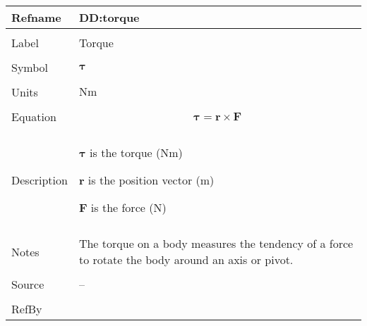 \documentclass[12pt]{article}
\begin{document}
\vspace{\baselineskip}
\noindent
\begin{minipage}{\textwidth}
\begin{tabular}{>{\raggedright}p{}>{\raggedright\arraybackslash}p{}}
\toprule \textbf{Refname} & \textbf{DD:torque}
\label{DD:torque}
\\ \midrule \\
Label & Torque
        
\\ \midrule \\
Symbol & $\symbf{τ}$
         
\\ \midrule \\
Units & $\text{N}\text{m}$
        
\\ \midrule \\
Equation & \begin{displaymath}
           \symbf{τ}=\symbf{r}\times\symbf{F}
           \end{displaymath}
\\ \midrule \\
Description & \begin{symbDescription}
              \item{$\symbf{τ}$ is the torque ($\text{N}\text{m}$)}
              \item{$\symbf{r}$ is the position vector (${\text{m}}$)}
              \item{$\symbf{F}$ is the force (${\text{N}}$)}
              \end{symbDescription}
\\ \midrule \\
Notes & The torque on a body measures the tendency of a force to rotate the body around an axis or pivot.
        
\\ \midrule \\
Source & --
         
\\ \midrule \\
RefBy & 
\\ \bottomrule
\end{tabular}
\end{minipage}
\end{document}
